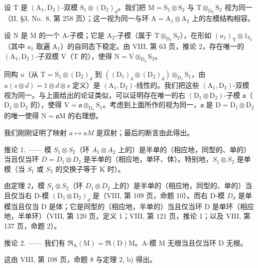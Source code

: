 设 \(\mathrm{T}\) 是 \((\mathrm{A}_1, \mathrm{D}_2)\)-双模 \(\mathrm{S}_1 \otimes (\mathrm{D}_2)_d\)。我们把 \(\mathrm{M} = \mathrm{S}_1 \otimes \mathrm{S}_2\) 与 \(\mathrm{T} \otimes_{\mathrm{D}_2} \mathrm{S}_2\) 视为同一（II, §3, No.~8, 第 258 页）；这一视为同一与环 \(\mathrm{A} = \mathrm{A}_1 \otimes \mathrm{A}_2\) 上的左模结构相容。

设 \(\mathrm{N}\) 是 \(\mathrm{M}\) 的一个 A-子模；它是 \(\mathrm{A}_2\)-子模（属于 \(\mathrm{T} \otimes_{\mathrm{D}_2} \mathrm{S}_2\)），在形如 \((a_1)_\mathrm{T} \otimes 1_{\mathrm{S}_2}\)（其中 \(a_1\) 取遍 \(\mathrm{A}_1\)）的自同态下稳定。由 VIII, 第 63 页，推论 2，存在唯一的 \((\mathrm{A}_1, \mathrm{D}_2)\)-子双模 \(\mathrm{V}\)（\(\mathrm{T}\) 的），使得 \(\mathrm{N} = \mathrm{V} \otimes_{\mathrm{D}_2} \mathrm{S}_2\)。

同构 \(u\)（从 \(\mathrm{T} = \mathrm{S}_1 \otimes (\mathrm{D}_2)_d\) 到 \(((\mathrm{D}_1)_d \otimes (\mathrm{D}_2)_d) \otimes_{\mathrm{D}_1} \mathrm{S}_1\)，由 \(u(s \otimes d) = 1 \otimes d \otimes s\) 定义）是 \((\mathrm{A}_1, \mathrm{D}_2)\)-线性的。我们把这些 \((\mathrm{A}_1, \mathrm{D}_2)\)-双模视为同一。与上面给出的论证类似，可以证明存在唯一的右 \((\mathrm{D}_1 \otimes \mathrm{D}_2)\)-子模 \(\mathfrak{a}\)（\(\mathrm{D}_1 \otimes \mathrm{D}_2\) 的），使得 \(\mathrm{V} = \mathfrak{a} \otimes_{\mathrm{D}_1} \mathrm{S}_1\)。考虑到上面所作的视为同一，\(\mathfrak{a}\) 是 \(\mathrm{D} = \mathrm{D}_1 \otimes \mathrm{D}_2\) 的唯一使得 \(\mathrm{N} = \mathfrak{a}\mathrm{M}\) 的右理想。

我们刚刚证明了映射 \(a \mapsto aM\) 是双射；最后的断言由此得出。

推论 1. —— 模 \(S_{1} \otimes S_{2}\)（环 \(A_{1} \otimes A_{2}\) 上的）是半单的（相应地，同型的、单的）当且仅当环 \(D = D_{1} \otimes D_{2}\) 是半单的（相应地，单环、体）。特别地，\(S_{1} \otimes S_{2}\) 是单模（当 \(S_{1}\) 或 \(S_{2}\) 的交换子等于 K 时）。

由定理 2，模 \(S_{1} \otimes S_{2}\)（环 \(D_{1} \otimes D_{2}\) 上的）是半单的（相应地，同型的、单的）当且仅当右 D-模 \((\mathrm{D}_{1} \otimes \mathrm{D}_{2})_{d}\) 是（VIII, 第 109 页，命题 10）。而右 D-模 \(D_{d}\) 是单模当且仅当 D 是体；它是同型的（相应地，半单的）当且仅当环 D 是单环（相应地，半单环）（VIII, 第 120 页，定义 1；VIII, 第 121 页，推论 1；以及 VIII, 第 137 页，命题 2）。

推论 2. —— 我们有 \(\mathfrak{R}_{\mathrm{A}}(\mathrm{M}) = \mathfrak{R}(\mathrm{D})\mathrm{M}\)。A-模 M 无根当且仅当环 D 无根。

这由 VIII, 第 108 页，命题 8 与定理 2, b) 得出。


